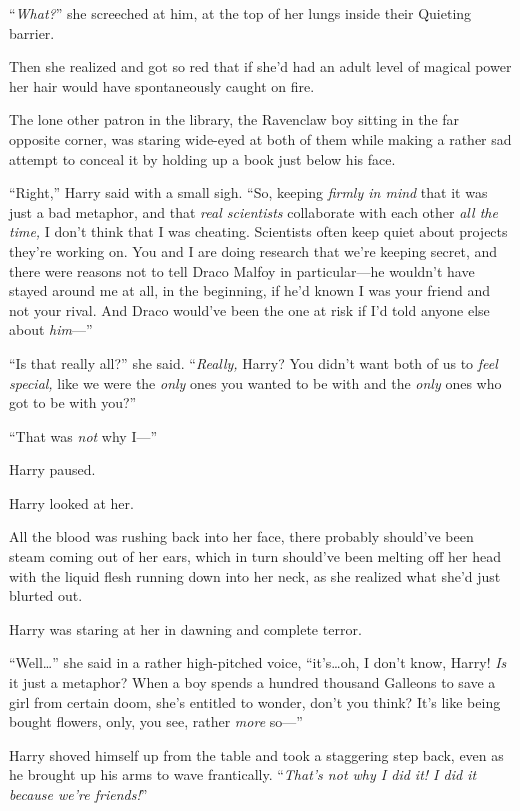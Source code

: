 “\emph{What?}” she screeched at him, at the top of her lungs inside their Quieting barrier.

Then she realized and got so red that if she’d had an adult level of magical power her hair would have spontaneously caught on fire.

The lone other patron in the library, the Ravenclaw boy sitting in the far opposite corner, was staring wide-eyed at both of them while making a rather sad attempt to conceal it by holding up a book just below his face.

“Right,” Harry said with a small sigh. “So, keeping \emph{firmly in mind} that it was just a bad metaphor, and that \emph{real scientists} collaborate with each other \emph{all the time,} I don’t think that I was cheating. Scientists often keep quiet about projects they’re working on. You and I are doing research that we’re keeping secret, and there were reasons not to tell Draco Malfoy in particular—he wouldn’t have stayed around me at all, in the beginning, if he’d known I was your friend and not your rival. And Draco would’ve been the one at risk if I’d told anyone else about \emph{him}—”

“Is that really all?” she said. “\emph{Really,} Harry? You didn’t want both of us to \emph{feel special,} like we were the \emph{only} ones you wanted to be with and the \emph{only} ones who got to be with you?”

“That was \emph{not} why I—”

Harry paused.

Harry looked at her.

All the blood was rushing back into her face, there probably should’ve been steam coming out of her ears, which in turn should’ve been melting off her head with the liquid flesh running down into her neck, as she realized what she’d just blurted out.

Harry was staring at her in dawning and complete terror.

“Well…” she said in a rather high-pitched voice, “it’s…oh, I don’t know, Harry! \emph{Is} it just a metaphor? When a boy spends a hundred thousand Galleons to save a girl from certain doom, she’s entitled to wonder, don’t you think? It’s like being bought flowers, only, you see, rather \emph{more} so—”

Harry shoved himself up from the table and took a staggering step back, even as he brought up his arms to wave frantically. “\emph{That’s not why I did it! I did it because we’re friends!}”

